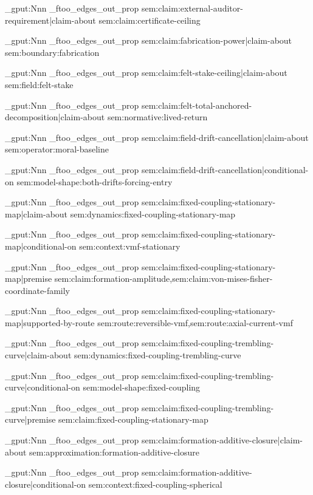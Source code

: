 \prop_gput:Nnn \g_ftoo_edges_out_prop { sem:claim:external-auditor-requirement|claim-about } { sem:claim:certificate-ceiling }

\prop_gput:Nnn \g_ftoo_edges_out_prop { sem:claim:fabrication-power|claim-about } { sem:boundary:fabrication }

\prop_gput:Nnn \g_ftoo_edges_out_prop { sem:claim:felt-stake-ceiling|claim-about } { sem:field:felt-stake }

\prop_gput:Nnn \g_ftoo_edges_out_prop { sem:claim:felt-total-anchored-decomposition|claim-about } { sem:normative:lived-return }

\prop_gput:Nnn \g_ftoo_edges_out_prop { sem:claim:field-drift-cancellation|claim-about } { sem:operator:moral-baseline }

\prop_gput:Nnn \g_ftoo_edges_out_prop { sem:claim:field-drift-cancellation|conditional-on } { sem:model-shape:both-drifts-forcing-entry }

\prop_gput:Nnn \g_ftoo_edges_out_prop { sem:claim:fixed-coupling-stationary-map|claim-about } { sem:dynamics:fixed-coupling-stationary-map }

\prop_gput:Nnn \g_ftoo_edges_out_prop { sem:claim:fixed-coupling-stationary-map|conditional-on } { sem:context:vmf-stationary }

\prop_gput:Nnn \g_ftoo_edges_out_prop { sem:claim:fixed-coupling-stationary-map|premise } { sem:claim:formation-amplitude,sem:claim:von-mises-fisher-coordinate-family }

\prop_gput:Nnn \g_ftoo_edges_out_prop { sem:claim:fixed-coupling-stationary-map|supported-by-route } { sem:route:reversible-vmf,sem:route:axial-current-vmf }

\prop_gput:Nnn \g_ftoo_edges_out_prop { sem:claim:fixed-coupling-trembling-curve|claim-about } { sem:dynamics:fixed-coupling-trembling-curve }

\prop_gput:Nnn \g_ftoo_edges_out_prop { sem:claim:fixed-coupling-trembling-curve|conditional-on } { sem:model-shape:fixed-coupling }

\prop_gput:Nnn \g_ftoo_edges_out_prop { sem:claim:fixed-coupling-trembling-curve|premise } { sem:claim:fixed-coupling-stationary-map }

\prop_gput:Nnn \g_ftoo_edges_out_prop { sem:claim:formation-additive-closure|claim-about } { sem:approximation:formation-additive-closure }

\prop_gput:Nnn \g_ftoo_edges_out_prop { sem:claim:formation-additive-closure|conditional-on } { sem:context:fixed-coupling-spherical }

